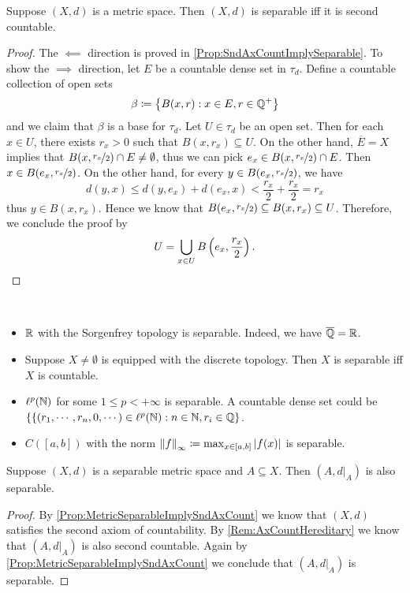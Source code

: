 \documentclass[screen,single]{techreport}
\numberwithin{equation}{section}
\begin{document}
\begin{proposition}\label{Prop:MetricSeparableImplySndAxCount}
	Suppose $(X,d)$ is a metric space.
	Then $(X,d)$ is separable iff it is second countable.
\end{proposition}
\begin{proof}
	The ${\impliedby}$ direction is proved in \cref{Prop:SndAxCountImplySeparable}.
	To show the ${\implies}$ direction, let $E$ be a countable dense set in $\tau_d$.
	Define a countable collection of open sets
	\[
	\beta \coloneqq \left\{ { B(x,r) : x \in E, r \in \mathbb{Q}^+} \right\}
	\]
	and we claim that $\beta$ is a base for $\tau_d$.
	Let $U \in \tau_d$ be an open set.
	Then for each $x \in U$, there exists $r_x > 0$ such that $B(x,r_x) \subseteq U$.
	On the other hand, $\overline{E} = X$ implies that $B(x,\nicefrac{r_x}{2}) \cap E \neq \emptyset$, thus we can pick $e_x \in B(x,\nicefrac{r_x}{2}) \cap E$.
	Then $x \in B(e_x,\nicefrac{r_x}{2})$.
	On the other hand, for every $y \in B(e_x,\nicefrac{r_x}{2})$, we have
	\[
	d(y,x) \le d(y,e_x) + d(e_x,x) < \frac{r_x}{2} + \frac{r_x}{2} = r_x
	\]
	thus $y \in B(x,r_x)$.
	Hence we know that $B(e_x,\nicefrac{r_x}{2}) \subseteq B(x,r_x) \subseteq U$.
	Therefore, we conclude the proof by
	\[
	U = \bigcup_{x \in U} B\left({e_x, \frac{r_x}{2}}\right).
	\]
\end{proof}

\begin{example}\label{Exa:SeparableSpaces}\
	\begin{itemize}
		\item $\mathbb{R}$ with the Sorgenfrey topology is separable. Indeed, we have $\overline{\mathbb{Q}} = \mathbb{R}$.
		\item Suppose $X \neq \emptyset$ is equipped with the discrete topology.
		Then $X$ is separable iff $X$ is countable.
		\item $\ell^p(\mathbb{N})$ for some $1 \le p < +\infty$ is separable.
		A countable dense set could be $\{  \{ (r_1,\cdots,r_n,0,\cdots) \in \ell^p(\mathbb{N}) : n \in \mathbb{N}, r_i \in \mathbb{Q} \}$.
		\item $C([a,b])$ with the norm $\left\|{f}\right\|_\infty \coloneqq \max_{x \in [a,b]} \left|{f(x)}\right|$ is separable.
	\end{itemize}
\end{example}

\begin{proposition}\label{Prop:SeparableMetricInduceSeparable}
	Suppose $(X,d)$ is a separable metric space and $A \subseteq X$.
	Then $(A,d|_A)$ is also separable.
\end{proposition}
\begin{proof}
	By \cref{Prop:MetricSeparableImplySndAxCount} we know that $(X,d)$ satisfies the second axiom of countability.
	By \cref{Rem:AxCountHereditary} we know that $(A,d|_A)$ is also second countable.
	Again by \cref{Prop:MetricSeparableImplySndAxCount} we conclude that $(A,d|_A)$ is separable.
\end{proof}
\end{document}
